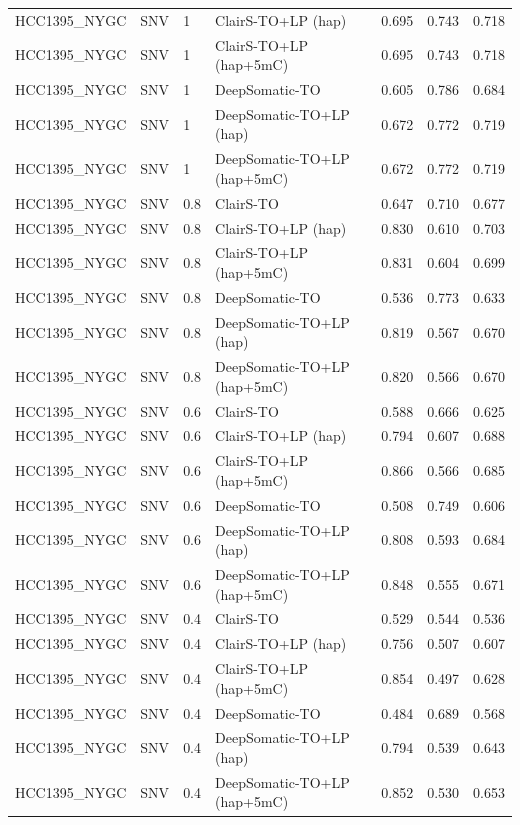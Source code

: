 \documentclass[pdflatex,sn-nature]{sn-jnl}
\begin{document}
{\begin{longtable}{@{}llllccc@{}}
  HCC1395\_NYGC & SNV & 1 & ClairS-TO+LP (hap) & 0.695 & 0.743 & 0.718 \\
  HCC1395\_NYGC & SNV & 1 & ClairS-TO+LP (hap+5mC) & 0.695 & 0.743 & 0.718 \\
  HCC1395\_NYGC & SNV & 1 & DeepSomatic-TO & 0.605 & 0.786 & 0.684 \\
  HCC1395\_NYGC & SNV & 1 & DeepSomatic-TO+LP (hap) & 0.672 & 0.772 & 0.719 \\
  HCC1395\_NYGC & SNV & 1 & DeepSomatic-TO+LP (hap+5mC) & 0.672 & 0.772 & 0.719 \\
  HCC1395\_NYGC & SNV & 0.8 & ClairS-TO & 0.647 & 0.710 & 0.677 \\
  HCC1395\_NYGC & SNV & 0.8 & ClairS-TO+LP (hap) & 0.830 & 0.610 & 0.703 \\
  HCC1395\_NYGC & SNV & 0.8 & ClairS-TO+LP (hap+5mC) & 0.831 & 0.604 & 0.699 \\
  HCC1395\_NYGC & SNV & 0.8 & DeepSomatic-TO & 0.536 & 0.773 & 0.633 \\
  HCC1395\_NYGC & SNV & 0.8 & DeepSomatic-TO+LP (hap) & 0.819 & 0.567 & 0.670 \\
  HCC1395\_NYGC & SNV & 0.8 & DeepSomatic-TO+LP (hap+5mC) & 0.820 & 0.566 & 0.670 \\
  HCC1395\_NYGC & SNV & 0.6 & ClairS-TO & 0.588 & 0.666 & 0.625 \\
  HCC1395\_NYGC & SNV & 0.6 & ClairS-TO+LP (hap) & 0.794 & 0.607 & 0.688 \\
  HCC1395\_NYGC & SNV & 0.6 & ClairS-TO+LP (hap+5mC) & 0.866 & 0.566 & 0.685 \\
  HCC1395\_NYGC & SNV & 0.6 & DeepSomatic-TO & 0.508 & 0.749 & 0.606 \\
  HCC1395\_NYGC & SNV & 0.6 & DeepSomatic-TO+LP (hap) & 0.808 & 0.593 & 0.684 \\
  HCC1395\_NYGC & SNV & 0.6 & DeepSomatic-TO+LP (hap+5mC) & 0.848 & 0.555 & 0.671 \\
  HCC1395\_NYGC & SNV & 0.4 & ClairS-TO & 0.529 & 0.544 & 0.536 \\
  HCC1395\_NYGC & SNV & 0.4 & ClairS-TO+LP (hap) & 0.756 & 0.507 & 0.607 \\
  HCC1395\_NYGC & SNV & 0.4 & ClairS-TO+LP (hap+5mC) & 0.854 & 0.497 & 0.628 \\
  HCC1395\_NYGC & SNV & 0.4 & DeepSomatic-TO & 0.484 & 0.689 & 0.568 \\
  HCC1395\_NYGC & SNV & 0.4 & DeepSomatic-TO+LP (hap) & 0.794 & 0.539 & 0.643 \\
  HCC1395\_NYGC & SNV & 0.4 & DeepSomatic-TO+LP (hap+5mC) & 0.852 & 0.530 & 0.653 \\

\end{longtable}}
\end{document}
